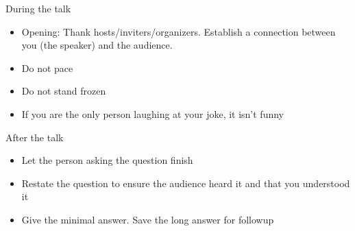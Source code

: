 During the talk
\begin{itemize}
    \item Opening: Thank hosts/inviters/organizers. Establish a connection between you (the speaker) and the audience.
    \item Do not pace
    \item Do not stand frozen
    \item If you are the only person laughing at your joke, it isn't funny
\end{itemize}
 
After the talk
\begin{itemize}
    \item Let the person asking the question finish
    \item Restate the question to ensure the audience heard it and that you understood it
    \item Give the minimal answer. Save the long answer for followup
\end{itemize}
